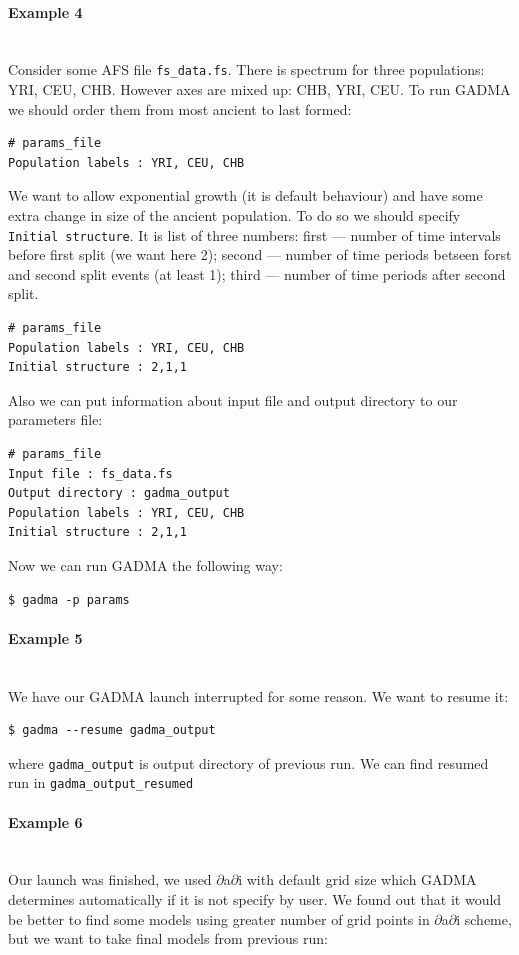 \documentclass[12pt]{article}
\makeatletter
\newcommand{\dadi}{$\partial$a$\partial$i\xspace}
\newcommand{\py}[1]{\lstinline[language=Python, showstringspaces=False]@#1@}
\makeatother
\begin{document}
\paragraph{Example 4}\mbox{}\\
Consider some AFS file \py{fs_data.fs}. There is spectrum for three populations: YRI, CEU, CHB. However axes are mixed up: CHB, YRI, CEU. To run GADMA we should order them from most ancient to last formed:
\begin{lstlisting}
# params_file
Population labels : YRI, CEU, CHB
\end{lstlisting}

We want to allow exponential growth (it is default behaviour) and have some extra change in size of the ancient population. To do so we should specify \py{Initial structure}. It is list of three numbers: first --- number of time intervals before first split (we want here 2); second --- number of time periods betseen forst and second split events (at least 1); third --- number of time periods after second split.

\begin{lstlisting}
# params_file
Population labels : YRI, CEU, CHB
Initial structure : 2,1,1
\end{lstlisting}

Also we can put information about input file and output directory to our parameters file:
\begin{lstlisting}
# params_file
Input file : fs_data.fs
Output directory : gadma_output
Population labels : YRI, CEU, CHB
Initial structure : 2,1,1
\end{lstlisting}

Now we can run GADMA the following way:
\begin{lstlisting}
$ gadma -p params
\end{lstlisting}

\paragraph{Example 5}\mbox{}\\
We have our GADMA launch interrupted for some reason. We want to resume it:
\begin{lstlisting}
$ gadma --resume gadma_output
\end{lstlisting}
where \py{gadma_output} is output directory of previous run. We can find resumed run in \py{gadma_output_resumed}

\paragraph{Example 6}\mbox{}\\
Our launch was finished, we used \dadi with default grid size which GADMA determines automatically if it is not specify by user. We found out that it would be better to find some models using greater number of grid points in \dadi scheme, but we want to take final models from previous run:
\end{document}
